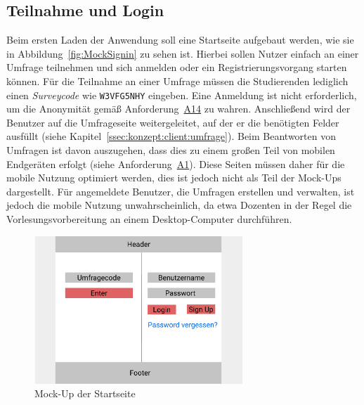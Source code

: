 \subsection{Teilnahme und Login}

Beim ersten Laden der Anwendung soll eine Startseite aufgebaut werden, wie sie in Abbildung~\vref{fig:MockSignin} zu sehen ist.
Hierbei sollen Nutzer einfach an einer Umfrage teilnehmen und sich anmelden oder ein Registrierungsvorgang starten können.
Für die Teilnahme an einer Umfrage müssen die Studierenden lediglich einen \emph{Surveycode} wie \zb \texttt{W3VFG5NHY} eingeben.
Eine Anmeldung ist nicht erforderlich, um die Anonymität gemäß Anforderung~\hyperref[Anf:A14]{A14} zu wahren.
Anschließend wird der Benutzer auf die Umfrageseite weitergeleitet, auf der er die benötigten Felder ausfüllt (siehe Kapitel~\ref{ssec:konzept:client:umfrage}).
Beim Beantworten von Umfragen ist davon auszugehen, dass dies zu einem großen Teil von mobilen Endgeräten erfolgt (siehe Anforderung~\hyperref[Anf:A1]{A1}).
Diese Seiten müssen daher für die mobile Nutzung optimiert werden, dies ist jedoch nicht als Teil der Mock-Ups dargestellt.
Für angemeldete Benutzer, die Umfragen erstellen und verwalten, ist jedoch die mobile Nutzung unwahrscheinlich, da etwa Dozenten in der Regel die Vorlesungsvorbereitung an einem Desktop-Computer durchführen.

\begin{figure}[H]
	\centering
	\includegraphics[width=0.7\textwidth]{img/konzeption/client/signin}
	\captionsetup{justification=centering, format=plain}
	\caption[Mock-Up der Startseite]{Mock-Up der Startseite \\\figma}
	\label{fig:MockSignin}
\end{figure}

